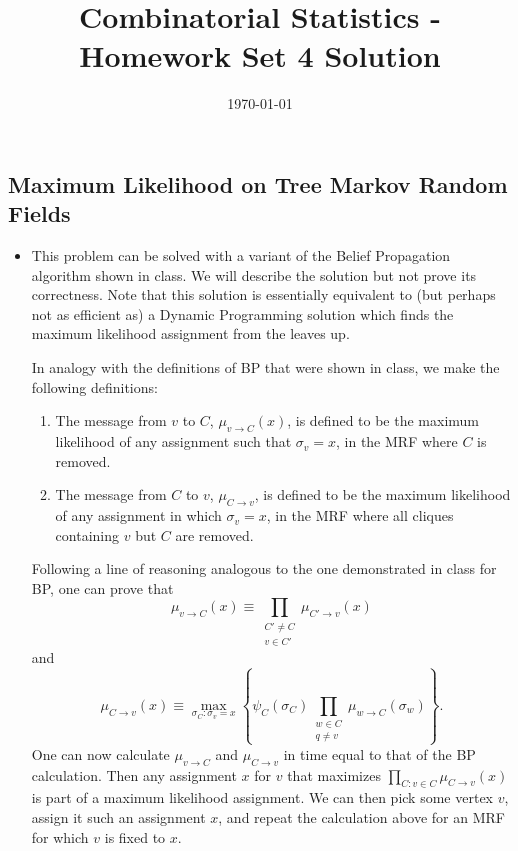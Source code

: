\documentclass[11pt]{article} \usepackage{amssymb}
\begin{document}
\title{Combinatorial Statistics - Homework Set 4 Solution}

\date{\today}
\maketitle
\subsection{Maximum Likelihood on Tree Markov Random Fields}
\begin{itemize}
\item This problem can be solved with a variant of the Belief
  Propagation algorithm shown in class. We will describe the solution
  but not prove its correctness. Note that this solution is
  essentially equivalent to (but perhaps not as efficient as) a
  Dynamic Programming solution which finds the maximum likelihood
  assignment from the leaves up.
   
  In analogy with the definitions of BP that were shown in class, we
  make the following definitions:
  \begin{enumerate}
  \item The message from $v$ to $C$, $\mu_{v\to C}(x)$, is defined to
    be the maximum likelihood of any assignment such that
    $\sigma_v=x$, in the MRF where $C$ is removed.
  \item The message from $C$ to $v$, $\mu_{C\to v}$, is defined to be
    the maximum likelihood of any assignment in which $\sigma_v=x$, in
    the MRF where all cliques containing $v$ but $C$ are removed.
  \end{enumerate}
  Following a line of reasoning analogous to the one demonstrated in
  class for BP, one can prove that
  \begin{equation}
    \label{eq:bp1}
    \mu_{v\to C}(x) \equiv
    \prod_{\substack{C'\neq C\\ v\in C'}}\mu_{C'\to v}(x)
  \end{equation}
  and
  \begin{equation}
    \label{eq:bp2}
    \mu_{C\to v}(x) \equiv
    \max_{\sigma_C:\sigma_v=x}
    \left\{
      \psi_C(\sigma_C)
      \prod_{\substack{w\in C\\ q\neq v}}\mu_{w\to C}(\sigma_w)
    \right\}.
  \end{equation}
  One can now calculate $\mu_{v\to C}$ and $\mu_{C\to v}$ in time
  equal to that of the BP calculation.  Then any assignment $x$ for
  $v$ that maximizes $\prod_{C:v\in C}\mu_{C\to v}(x)$ is part of a
  maximum likelihood assignment. We can then pick some vertex $v$,
  assign it such an assignment $x$, and repeat the calculation above
  for an MRF for which $v$ is fixed to $x$.
  

\end{itemize}
\end{document}
